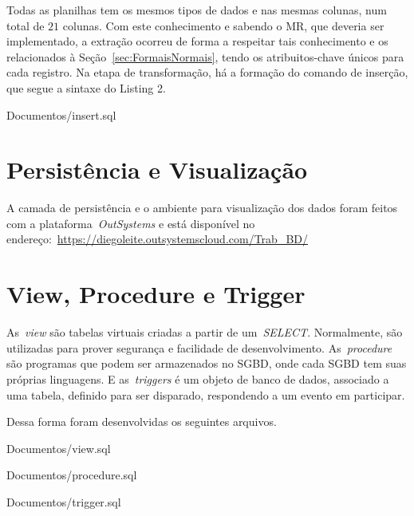 \documentclass [12pt]{article}
\begin{document}
	Todas as planilhas tem os mesmos tipos de dados e nas mesmas colunas, num total de $21$ colunas. Com este conhecimento e sabendo o MR, que deveria ser implementado, a extração ocorreu de forma a respeitar tais conhecimento e os relacionados à Seção~\ref{sec:FormaisNormais}, tendo os atribuitos-chave únicos para cada registro. Na etapa de transformação, há a formação do comando de inserção, que segue a sintaxe do Listing 2.
	
	
					{Documentos/insert.sql}
	
	\section{Persistência e Visualização}
		\label{sec:Per&Vis}
	A camada de persistência e o ambiente para visualização dos dados foram feitos com a plataforma~\emph{OutSystems} e está disponível no endereço:~\url{https://diegoleite.outsystemscloud.com/Trab_BD/}
	
	\section{View, Procedure e Trigger}
		\label{sec:VPT}
	As~\emph{view} são tabelas virtuais criadas a partir de um~\emph{SELECT}. Normalmente, são utilizadas para prover segurança e facilidade de desenvolvimento. As~\emph{procedure} são programas que podem ser armazenados no SGBD, onde cada SGBD tem suas próprias linguagens. E as~\emph{triggers} é um objeto de banco de dados, associado a uma tabela, definido para ser disparado, respondendo a um evento em participar.
	
	Dessa forma foram desenvolvidas os seguintes arquivos.
	
	
					{Documentos/view.sql}
					
	
					{Documentos/procedure.sql}
	
	
					{Documentos/trigger.sql}
\end{document}
